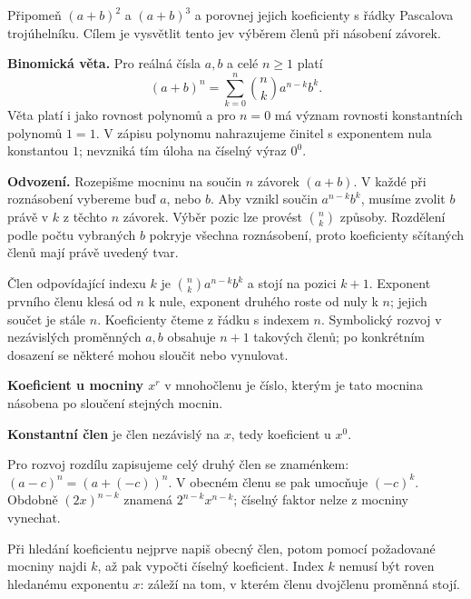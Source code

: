 \documentclass[11pt,a4paper]{article}
\begin{document}
Připomeň $(a+b)^2$ a $(a+b)^3$ a porovnej jejich koeficienty s řádky Pascalova trojúhelníku. Cílem je vysvětlit tento jev výběrem členů při násobení závorek.


\textbf{Binomická věta.} Pro reálná čísla $a,b$ a celé $n\geq1$ platí
\[
 (a+b)^n=\sum_{k=0}^n\binom nk a^{n-k}b^k.
\]
Věta platí i jako rovnost polynomů a pro $n=0$ má význam rovnosti konstantních polynomů $1=1$. V zápisu polynomu nahrazujeme činitel s exponentem nula konstantou $1$; nevzniká tím úloha na číselný výraz $0^0$.

\textbf{Odvození.} Rozepišme mocninu na součin $n$ závorek $(a+b)$. V každé při roznásobení vybereme buď $a$, nebo $b$. Aby vznikl součin $a^{n-k}b^k$, musíme zvolit $b$ právě v $k$ z těchto $n$ závorek. Výběr pozic lze provést $\binom nk$ způsoby. Rozdělení podle počtu vybraných $b$ pokryje všechna roznásobení, proto koeficienty sčítaných členů mají právě uvedený tvar.

Člen odpovídající indexu $k$ je $\binom nk a^{n-k}b^k$ a stojí na pozici $k+1$. Exponent prvního členu klesá od $n$ k nule, exponent druhého roste od nuly k $n$; jejich součet je stále $n$. Koeficienty čteme z řádku s indexem $n$. Symbolický rozvoj v nezávislých proměnných $a,b$ obsahuje $n+1$ takových členů; po konkrétním dosazení se některé mohou sloučit nebo vynulovat.\begin{definiceBox}
\textbf{Koeficient u mocniny $x^r$} v mnohočlenu je číslo, kterým je tato mocnina násobena po sloučení stejných mocnin.
\end{definiceBox}
\begin{definiceBox}
\textbf{Konstantní člen} je člen nezávislý na $x$, tedy koeficient u $x^0$.
\end{definiceBox}

Pro rozvoj rozdílu zapisujeme celý druhý člen se znaménkem: $(a-c)^n=(a+(-c))^n$. V obecném členu se pak umocňuje $(-c)^k$. Obdobně $(2x)^{n-k}$ znamená $2^{n-k}x^{n-k}$; číselný faktor nelze z mocniny vynechat.

Při hledání koeficientu nejprve napiš obecný člen, potom pomocí požadované mocniny najdi $k$, až pak vypočti číselný koeficient. Index $k$ nemusí být roven hledanému exponentu $x$: záleží na tom, v kterém členu dvojčlenu proměnná stojí.
\end{document}
